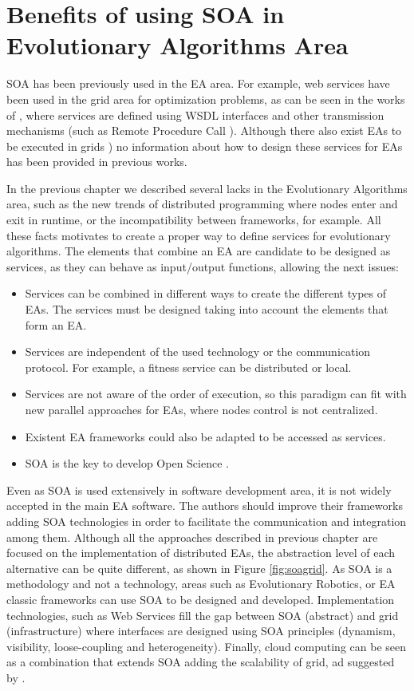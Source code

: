 \section{Benefits of using SOA in Evolutionary Algorithms Area}

\lettrine{S}{OA} has been previously used in the EA area. For example, web services have been used in the grid area for optimization problems, as can be seen in the works of \cite{grid1,grid2,grid3,grid5}, where services are defined using WSDL interfaces and other transmission mechanisms (such as Remote Procedure Call \citep{grid6,grid7}). Although there also exist EAs to be executed in grids \citep{grid8,grid4,grid10}) no information about how to design these services for EAs has been provided in previous works. 

In the previous chapter we described several lacks in the Evolutionary Algorithms area, such as the new trends of distributed programming where nodes enter and exit in runtime, or the incompatibility between frameworks, for example. All these facts motivates to create a proper way to define services for evolutionary algorithms. The elements that combine an EA are candidate to be designed as services, as they can behave as input/output functions, allowing the next issues:  

\begin{itemize}
\item Services can be combined in different ways to create the different types of EAs. The services must be designed taking into account the elements that form an EA. 
\item Services are independent of the used technology or the communication protocol. For example, a fitness service can be distributed or local.
\item Services are not aware of the order of execution, so this paradigm can fit with new parallel approaches for EAs, where nodes control is not centralized. 
\item Existent EA frameworks could also be adapted to be accessed as services.
\item SOA is the key to develop Open Science \cite{Foster2005Science}.
\end{itemize}

Even as SOA is used extensively in software development area, it is not widely accepted in the main EA software. The authors should improve their frameworks adding SOA technologies in order to facilitate the communication and integration among them. Although all the approaches described in previous chapter are focused on the implementation of distributed EAs, the abstraction level of each alternative can be quite different, as shown in Figure \ref{fig:soagrid}.  As SOA is a methodology and not a technology, areas such as Evolutionary Robotics, or EA classic frameworks can use SOA to be designed and developed. Implementation technologies, such as Web Services fill the gap between SOA (abstract) and grid (infrastructure) where interfaces are designed using SOA principles (dynamism, visibility, loose-coupling and heterogeneity). Finally, cloud computing can be seen as a combination that extends SOA adding the scalability of grid, ad suggested by  \citep{SOALIB}.


